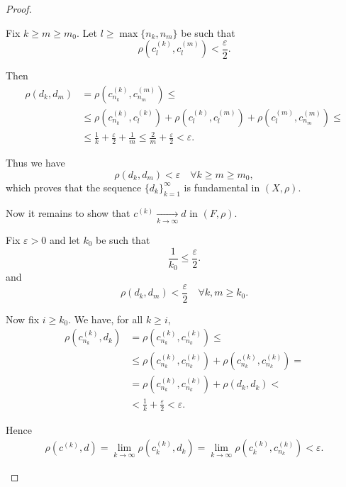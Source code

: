 \begin{proof}
\begin{ThmEnum}
    Fix \( k \geq m \geq m_0 \). Let \( l \geq \max \{ n_k, n_m \} \) be such that
    \begin{equation*}
      \rho(c_l^{(k)}, c_l^{(m)}) < \frac \varepsilon 2.
    \end{equation*}

    Then
    \begin{align*}
      \rho(d_k, d_m)
       & =
      \rho(c_{n_k}^{(k)}, c_{n_m}^{(m)})
      \leq \\ &\leq
      \rho(c_{n_k}^{(k)}, c_l^{(k)}) + \rho(c_l^{(k)}, c_l^{(m)}) + \rho(c_l^{(m)}, c_{n_m}^{(m)})
      \leq \\ &\leq
      \frac 1 k + \frac \varepsilon 2 + \frac 1 m
      \leq
      \frac 2 m + \frac \varepsilon 2
      <
      \varepsilon.
    \end{align*}

    Thus we have
    \begin{equation*}
      \rho(d_k, d_m) < \varepsilon \quad\forall k \geq m \geq m_0,
    \end{equation*}
    which proves that the sequence \( \{ d_k \}_{k=1}^\infty \) is fundamental in \( (X, \rho) \).

    Now it remains to show that \( c^{(k)} \xrightarrow[k \to \infty]{} d \) in \( (F, \rho) \).

    Fix \( \varepsilon > 0 \) and let \( k_0 \) be such that
    \begin{equation*}
      \frac 1 {k_0} \leq \frac \varepsilon 2.
    \end{equation*}
    and
    \begin{equation*}
      \rho(d_k, d_m) < \frac \varepsilon 2 \quad\forall k, m \geq k_0.
    \end{equation*}

    Now fix \( i \geq k_0 \). We have, for all \( k \geq i \),
    \begin{align*}
      \rho(c_{n_k}^{(k)}, d_k)
       & =
      \rho(c_{n_k}^{(k)}, c_{n_k}^{(k)})
      \leq \\ &\leq
      \rho(c_{n_k}^{(k)}, c_{n_k}^{(k)}) + \rho(c_{n_k}^{(k)}, c_{n_k}^{(k)})
      =    \\ &=
      \rho(c_{n_k}^{(k)}, c_{n_k}^{(k)}) + \rho(d_k, d_k)
      <    \\ &<
      \frac 1 k + \frac \varepsilon 2
      <
      \varepsilon.
    \end{align*}

    Hence
    \begin{align*}
      \rho(c^{(k)}, d)
      =
      \lim_{k \to \infty} \rho(c_k^{(k)}, d_k)
      =
      \lim_{k \to \infty} \rho(c_k^{(k)}, c_{n_k}^{(k)})
      <
      \varepsilon.
    \end{align*}


\end{ThmEnum}
\end{proof}
